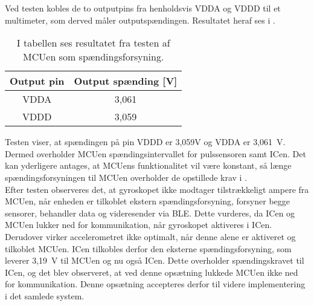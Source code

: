 Ved testen kobles de to outputpins fra henholdsvis VDDA og VDDD til et multimeter, som derved måler outputspændingen. Resultatet heraf ses i .
\begin{table}[H]
	\centering
	\begin{tabular}{cc}
		\hline
		\cellcolor[HTML]{C0C0C0} Output pin & \cellcolor[HTML]{C0C0C0} Output spænding {[}V{]} \\ \hline
		VDDA & 3,061 \\ \hline
		VDDD & 3,059  \\ \hline
	\end{tabular}
	\caption{I tabellen ses resultatet fra testen af MCUen som spændingsforsyning.}
	\label{tab:IC_spaending}
\end{table}\vspace{-0.25cm}
Testen viser, at spændingen på pin VDDD er 3,059V og VDDA er 3,061~V. Dermed overholder MCUen spændingsintervallet for pulssensoren samt ICen. Det kan yderligere antages, at MCUens funktionalitet vil være konstant, så længe spændingsforsyningen til MCUen overholder de opstillede krav i .\\
Efter testen observeres det, at gyroskopet ikke modtager tilstrækkeligt ampere fra MCUen, når enheden er tilkoblet ekstern spændingsforsyning, forsyner begge sensorer, behandler data og videresender via BLE. Dette vurderes, da ICen og MCUen lukker ned for kommunikation, når gyroskopet aktiveres i ICen. Derudover virker accelerometret ikke optimalt, når denne alene er aktiveret og tilkoblet MCUen. ICen tilkobles derfor den eksterne spændingsforsyning, som leverer 3,19~V til MCUen og nu også ICen. Dette overholder spændingskravet til ICen, og det blev observeret, at ved denne opsætning lukkede MCUen ikke ned for kommunikation. Denne opsætning accepteres derfor til videre implementering i det samlede system.